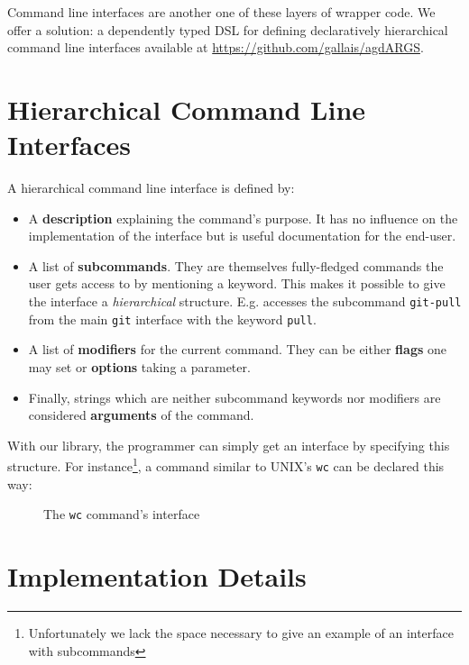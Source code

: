 \documentclass[preprint,9pt]{sigplanconf}
\begin{document}
Command line interfaces are another one of these layers of wrapper
code. We offer a solution: a dependently typed DSL for defining
declaratively hierarchical command line interfaces available at
\url{https://github.com/gallais/agdARGS}.

\section{Hierarchical Command Line Interfaces}
\label{hcli}

A hierarchical command line interface is defined by:

\begin{itemize}
\item A \textbf{description} explaining the command's purpose. It has no
influence on the implementation of the interface but is useful
documentation for the end-user.

\item A list of \textbf{subcommands}. They are themselves fully-fledged
commands the user gets access to by mentioning a keyword. This
makes it possible to give the interface a \emph{hierarchical}
structure. E.g.  accesses the subcommand
\texttt{git-pull} from the main \texttt{git} interface with the
keyword \texttt{pull}.

\item A list of \textbf{modifiers} for the current command. They can
be either \textbf{flags} one may set or \textbf{options} taking
a parameter.

\item Finally, strings which are neither subcommand keywords nor
modifiers are considered \textbf{arguments} of the command.
\end{itemize}

With our library, the programmer can simply get an interface by
specifying this structure. For instance\footnote{Unfortunately
we lack the space necessary to give an example of an interface
with subcommands}, a command similar to UNIX's \texttt{wc} can
be declared this way:

\begin{figure}[ht]
\caption{The \texttt{wc} command's interface}\label{wc-cli}
\end{figure}

\section{Implementation Details}
\end{document}
